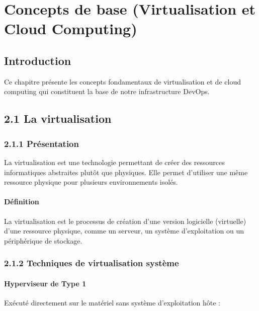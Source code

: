 \documentclass[12pt,a4paper]{report}
\begin{document}
\chapter{Concepts de base (Virtualisation et Cloud Computing)}

\section{Introduction}

Ce chapitre présente les concepts fondamentaux de virtualisation et de cloud computing qui constituent la base de notre infrastructure DevOps.

\section{2.1 La virtualisation}

\subsection{2.1.1 Présentation}

La virtualisation est une technologie permettant de créer des ressources informatiques abstraites plutôt que physiques. Elle permet d'utiliser une même ressource physique pour plusieurs environnements isolés.

\subsubsection{Définition}

La virtualisation est le processus de création d'une version logicielle (virtuelle) d'une ressource physique, comme un serveur, un système d'exploitation ou un périphérique de stockage.

\subsection{2.1.2 Techniques de virtualisation système}

\subsubsection{Hyperviseur de Type 1}

Exécuté directement sur le matériel sans système d'exploitation hôte :
\end{document}
